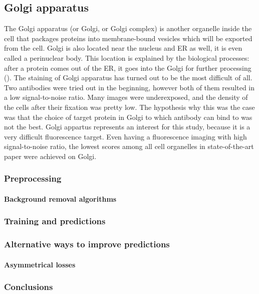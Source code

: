 \subsection{Golgi apparatus}
    The Golgi apparatus (or Golgi, or Golgi complex) is another organelle inside the cell that packages proteins into membrane-bound vesicles which will be exported from the cell. Golgi is also located near the nucleus and ER as well, it is even called a perinuclear body. This location is explained by the biological processes: after a protein comes out of the ER, it goes into the Golgi for further processing (\cite{golgi}). The staining of Golgi apparatus has turned out to be the most difficult of all. Two antibodies were tried out in the beginning, however both of them resulted in a low signal-to-noise ratio. Many images were underexposed, and the density of the cells after their fixation was pretty low. The hypothesis why this was the case was that the choice of target protein in Golgi to which antibody can bind to was not the best. Golgi appartus represents an interest for this study, because it is a very difficult fluorescence target. Even having a fluorescence imaging with high signal-to-noise ratio, the lowest scores among all cell organelles in state-of-the-art paper \cite{Cheng_2021} were achieved on Golgi.
    \subsubsection{Preprocessing}
        
        \paragraph{Background removal algorithms}
            \label{par:background-removal}
            
    \subsubsection{Training and predictions}
        

    \subsubsection{Alternative ways to improve predictions}
        \paragraph{Asymmetrical losses}
            
    \subsubsection{Conclusions}
        